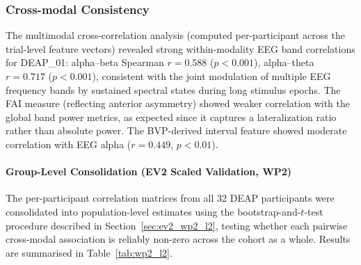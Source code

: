 \subsubsection{Cross-modal Consistency}

The multimodal cross-correlation analysis (computed per-participant across the trial-level feature vectors) revealed strong within-modality EEG band correlations for DEAP\_01: alpha--beta Spearman $r = 0.588$ ($p < 0.001$), alpha--theta $r = 0.717$ ($p < 0.001$), consistent with the joint modulation of multiple EEG frequency bands by sustained spectral states during long stimulus epochs. The \gls{FAI} measure (reflecting anterior asymmetry) showed weaker correlation with the global band power metrics, as expected since it captures a lateralization ratio rather than absolute power. The BVP-derived interval feature showed moderate correlation with EEG alpha ($r = 0.449$, $p < 0.01$).

\paragraph{Group-Level Consolidation (EV2 Scaled Validation, WP2)}

The per-participant correlation matrices from all 32 DEAP participants were consolidated into population-level estimates using the bootstrap-and-$t$-test procedure described in Section~\ref{sec:ev2_wp2_l2}, testing whether each pairwise cross-modal association is reliably non-zero across the cohort as a whole. Results are summarised in Table~\ref{tab:wp2_l2}.

